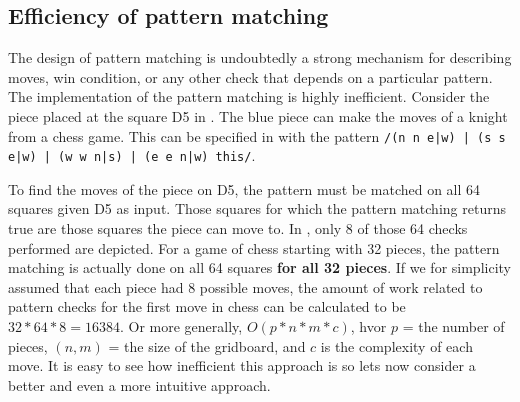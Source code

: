 \subsection{Efficiency of pattern matching}
\label{sec:patternmatchingefficiency}
The design of pattern matching is undoubtedly a strong mechanism for describing moves, win condition, or any other check that depends on a particular pattern. The implementation of the pattern matching is highly inefficient. Consider the piece placed at the square D5 in . The blue piece can make the moves of a knight from a chess game. This can be specified in \productname{} with the pattern \texttt{/(n n e|w) | (s s e|w) | (w w n|s) | (e e n|w) this/}.


To find the moves of the piece on D5, the pattern must be matched on all 64 squares given D5 as input. Those squares for which the pattern matching returns true are those squares the piece can move to. In , only 8 of those 64 checks performed are depicted. For a game of chess starting with 32 pieces, the pattern matching is actually done on all 64 squares \textbf{for all 32 pieces}. If we for simplicity assumed that each piece had 8 possible moves, the amount of work related to pattern checks for the first move in chess can be calculated to be $32 * 64 * 8 = 16384$.
Or more generally, $O(p * n * m * c)$, hvor $p$ = the number of pieces, $(n, m)$ = the size of the gridboard, and $c$ is the complexity of each move. It is easy to see how inefficient this approach is so lets now consider a better and even a more intuitive approach.

